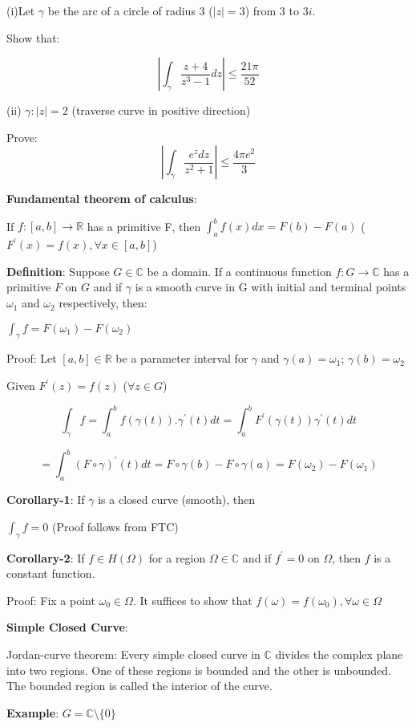 \documentclass{article}
\begin{document}
\begin{flushleft}
(i)Let $\gamma$ be the arc of a circle of radius 3 ($|z|=3$) from $3$ to $3i$.

Show that:

$$|\int_{\gamma}^{} \frac{z+4}{z^3-1} dz| \leq \frac{21\pi}{52}$$

(ii) $\gamma: |z|=2$  (traverse curve in positive direction)

Prove: $$|\int_{\gamma}^{} \frac{e^z dz}{z^2+1} | \leq \frac{4\pi e^2}{3}$$

\textbf{Fundamental theorem of calculus}: 

If $f:[a,b]\rightarrow \mathds{R}$ has a primitive F, then $\int_{a}^{b} f(x) dx =F(b)-F(a)$ ($F^{'}(x)=f(x), \forall x\in [a,b]$)

\textbf{Definition}: Suppose $G\in \mathds{C}$ be a domain. If a continuous function $f:G\rightarrow \mathds{C}$ has a primitive $F$ on $G$ and if $\gamma$ is a smooth curve in G with initial and terminal points $\omega_1$ and $\omega_2$ respectively, then:

$\int_{\gamma}^{} f = F(\omega_1) - F(\omega_2)$

Proof: Let $[a,b]\in \mathds{R}$ be a parameter interval for $\gamma$ and $\gamma(a)=\omega_1$; $\gamma(b)=\omega_2$

Given $F^{'}(z)=f(z)$   ($\forall z \in G$)

$$\int_{\gamma}^{} f = \int_{a}^{b} f(\gamma(t)).\gamma^{'}(t) dt = \int_{a}^{b} F^{'}(\gamma(t))\gamma^{'}(t) dt$$

$$= \int_{a}^{b} (F \circ \gamma)^{'}(t) dt = F \circ \gamma(b)-F \circ \gamma(a)= F(\omega_2)-F(\omega_1)$$

\textbf{Corollary-1}: If $\gamma$ is a closed curve (smooth), then

$\int_{\gamma}^{} f =0$ (Proof follows from FTC)

\textbf{Corollary-2}: If $f\in H(\Omega)$ for a region $\Omega\in \mathds{C}$ and if $f^{'}=0$ on $\Omega$, then $f$ is a constant function.

Proof: Fix a point $\omega_0\in \Omega$. It suffices to show that $f(\omega)=f(\omega_0), \forall \omega \in \Omega$

\textbf{Simple Closed Curve}: 

Jordan-curve theorem: Every simple closed curve in $\mathds{C}$ divides the complex plane into two regions. One of these regions is bounded and the other is unbounded. The bounded region is called the interior of the curve.

\textbf{Example}: $G=\mathds{C}\setminus \{0\}$


\end{flushleft}
\end{document}

